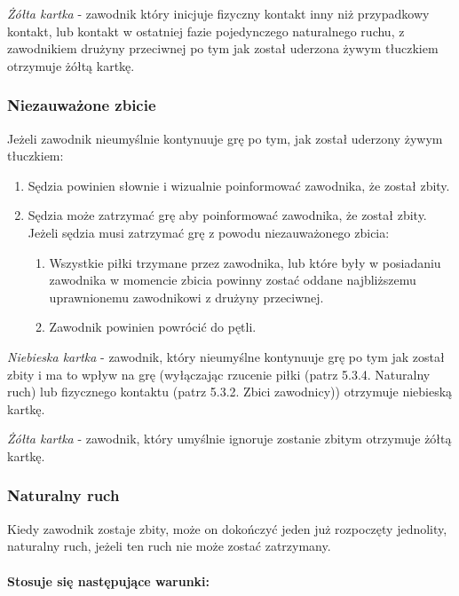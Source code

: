 \documentclass[12pt]{article}
\begin{document}
\emph{Żółta kartka} - zawodnik który inicjuje fizyczny kontakt inny niż
przypadkowy kontakt, lub kontakt w ostatniej fazie pojedynczego
naturalnego ruchu, z zawodnikiem drużyny przeciwnej po tym jak został
uderzona żywym tłuczkiem otrzymuje żółtą kartkę.

\subsubsection{Niezauważone zbicie}

Jeżeli zawodnik nieumyślnie kontynuuje grę po tym, jak został uderzony
żywym tłuczkiem:
\begin{enumerate}
\item Sędzia powinien słownie i wizualnie poinformować zawodnika, że został
zbity.

\item Sędzia może zatrzymać grę aby poinformować zawodnika, że został
zbity. Jeżeli sędzia musi zatrzymać grę z powodu niezauważonego zbicia:
\begin{enumerate}
\item Wszystkie piłki trzymane przez zawodnika, lub które były w posiadaniu
zawodnika w momencie zbicia powinny zostać oddane najbliższemu
uprawnionemu zawodnikowi z drużyny przeciwnej.

\item Zawodnik powinien powrócić do pętli.
\end{enumerate}
\end{enumerate}

\emph{Niebieska kartka} - zawodnik, który nieumyślne kontynuuje grę po
tym jak został zbity i ma to wpływ na grę (wyłączając rzucenie piłki
(patrz 5.3.4. Naturalny ruch) lub fizycznego kontaktu (patrz 5.3.2.
Zbici zawodnicy)) otrzymuje niebieską kartkę.

\emph{Żółta kartka} - zawodnik, który umyślnie ignoruje zostanie zbitym
otrzymuje żółtą kartkę.

\subsubsection{Naturalny ruch}

Kiedy zawodnik zostaje zbity, może on dokończyć jeden już rozpoczęty
jednolity, naturalny ruch, jeżeli ten ruch nie może zostać zatrzymany.

\paragraph{Stosuje się następujące warunki:}
\end{document}
